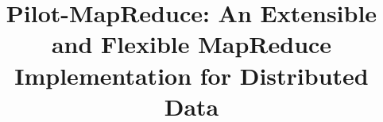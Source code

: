 \documentclass{acm_proc_article-sp}
\begin{document}
\title{Pilot-MapReduce: An Extensible and Flexible
  MapReduce Implementation for Distributed Data}

%
%
%
%
%
\end{document}
